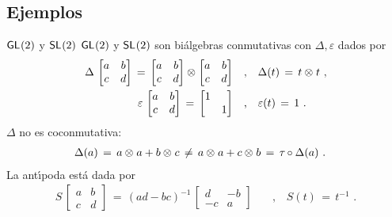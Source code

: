 \subsection{Ejemplos}

\begin{frame}{$\mathsf{GL}_{}(2)$ y $\mathsf{SL}_{}(2)$}
	$\mathsf{GL}_{}(2)$ y $\mathsf{SL}_{}(2)$ son bi\'{a}lgebras conmutativas con
	$\Delta,\varepsilon$ dados por
	\begin{align*}
		\Delta\,\begin{bmatrix} a & b \\ c & d \end{bmatrix} \,=\,
			\begin{bmatrix} a & b \\ c & d \end{bmatrix} \otimes_{}
			\begin{bmatrix} a & b \\ c & d \end{bmatrix}
			& \quad\text{,}\quad
			\Delta(t)\,=\,t\otimes_{} t \text{ ,} \\
		\varepsilon\,\begin{bmatrix} a & b \\ c & d \end{bmatrix} \,=\,
			\begin{bmatrix} 1 & \\ & 1 \end{bmatrix}
			& \quad\text{,}\quad
			\varepsilon(t) \,=\,1
		\text{ .}
	\end{align*}
	$\Delta$ no es coconmutativa:
	\begin{align*}
		\Delta(a) & \,=\,a\otimes_{} a+b\otimes_{} c\,\not=\,
			a\otimes_{} a+c\otimes_{} b \,=\,\tau_{}\circ\Delta(a)
		\text{ .}
	\end{align*}
	La ant\'{\i}poda est\'{a} dada por
	\begin{align*}
		S\,\begin{bmatrix} a & b \\ c & d \end{bmatrix} \,=\,
			(ad-bc)^{-1}\,
			\begin{bmatrix} d & -b \\ -c & a \end{bmatrix}
			& \quad\text{,}\quad
			S(t) \,=\,t^{-1}
		\text{ .}
	\end{align*}
\end{frame}

